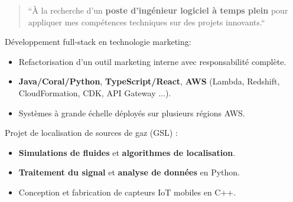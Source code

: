\documentclass[10pt,a4paper,ragged2e,withhyper]{../AltaCV/altacv}
\begin{document}



\makecvheader


\begin{paracol}{2}

  \begin{quote}
    \small
    ``À la recherche d'un \textbf{poste d'ingénieur logiciel à temps plein} pour appliquer mes compétences techniques sur des projets innovants.``
  \end{quote}


  Développement full-stack en technologie marketing:

  \begin{itemize}
    \item Refactorisation d'un outil marketing interne avec responsabilité complète.
    \item \textbf{Java/Coral/Python}, \textbf{TypeScript/React}, \textbf{AWS} (Lambda, Redshift, CloudFormation, CDK, API Gateway ...).
    \item Systèmes à grande échelle déployés sur plusieurs régions AWS.
  \end{itemize}

  \divider

  Projet de localisation de sources de gaz (GSL) :
  \begin{itemize}
    \item \textbf{Simulations de fluides} et \textbf{algorithmes de localisation}.
    \item \textbf{Traitement du signal} et \textbf{analyse de données} en Python.
    \item Conception et fabrication de capteurs IoT mobiles en C++.
  \end{itemize}


\end{paracol}
\end{document}
